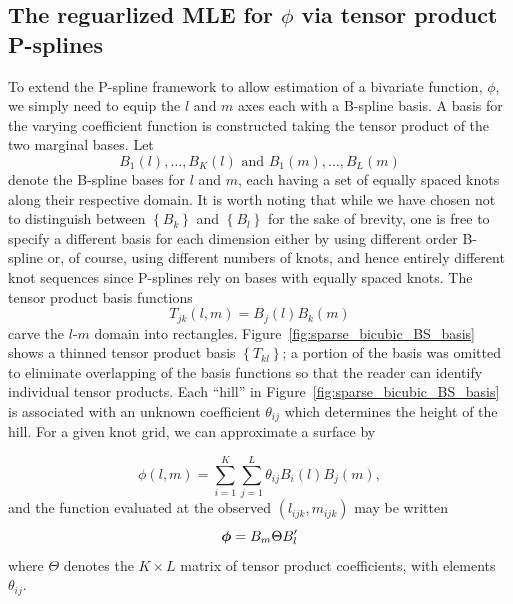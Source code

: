 \subsection{The reguarlized MLE for $\phi$ via tensor product P-splines}
% 
To extend the P-spline framework to allow estimation of a bivariate function, $\phi$, we simply need to equip the $l$ and $m$ axes each with a B-spline basis. A basis for the varying coefficient function is constructed taking the tensor product of the two marginal bases. Let 
\[
B_{1}\left(l\right),\dots, B_{K}\left(l\right)  \mbox{ and } B_{1}\left(m\right),\dots, B_{L}\left(m\right)
\]
denote the B-spline bases for $l$ and $m$, each having a set of equally spaced knots along their respective domain. It is worth noting that while we have chosen not to distinguish between $\left\{ B_k \right\}$ and $\left\{ {B}_l \right\}$ for the sake of brevity, one is free to specify a different basis for each dimension either by using different order B-spline or, of course, using different numbers of knots, and hence entirely different knot sequences since P-splines rely on bases with equally spaced knots. The tensor product basis functions
\begin{equation*}
T_{jk}\left(l,m\right) = B_j\left(l\right){B}_k\left(m\right)
\end{equation*}
\noindent
carve the $l$-$m$ domain into rectangles.  Figure~\ref{fig:sparse_bicubic_BS_basis} shows a thinned tensor product basis $\left\{ T_{kl} \right\}$; a portion of the basis was omitted to eliminate overlapping of the basis functions so that the reader can identify individual tensor products. Each ``hill'' in Figure~\ref{fig:sparse_bicubic_BS_basis} is associated with an unknown coefficient $\theta_{ij}$ which determines the height of the hill. For a given knot grid, we can approximate a surface by

\begin{equation} \label{eq:varying-coefficient-tensor-product-expansion}
\phi\left(l,m\right) = \sum_{i=1}^K \sum_{j=1}^L \theta_{ij} B_{i}\left(l\right) B_{j}\left(m\right), 
\end{equation}
\noindent
and the function evaluated at the observed $\left(l_{ijk}, m_{ijk}\right)$ may be written 
\begin{equation*} 
\mbox{\boldmath $\phi$} = B_m \Theta B_l^\prime
\end{equation*}
\noindent 
where $\Theta$ denotes the $K \times L$ matrix of tensor product coefficients, with elements $\theta_{ij}$.

